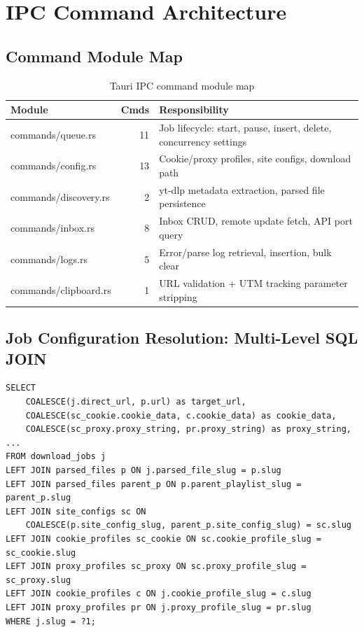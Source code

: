 \documentclass[10pt,letterpaper]{article}
\begin{document}
\section{IPC Command Architecture}

\subsection{Command Module Map}

\begin{table}[H]
\centering\small
\renewcommand{\arraystretch}{1.3}
\begin{tabular}{>{\ttfamily}lrl}
\toprule
Module & Cmds & Responsibility \\
\midrule
commands/queue.rs & 11 & Job lifecycle: start, pause, insert, delete, concurrency settings \\
commands/config.rs & 13 & Cookie/proxy profiles, site configs, download path \\
commands/discovery.rs & 2 & yt-dlp metadata extraction, parsed file persistence \\
commands/inbox.rs & 8 & Inbox CRUD, remote update fetch, API port query \\
commands/logs.rs & 5 & Error/parse log retrieval, insertion, bulk clear \\
commands/clipboard.rs & 1 & URL validation + UTM tracking parameter stripping \\
\bottomrule
\end{tabular}
\caption{Tauri IPC command module map}
\end{table}

\subsection{Job Configuration Resolution: Multi-Level SQL JOIN}

\begin{lstlisting}[caption={Multi-join config resolution (engine/process.rs)}]
SELECT
    COALESCE(j.direct_url, p.url) as target_url,
    COALESCE(sc_cookie.cookie_data, c.cookie_data) as cookie_data,
    COALESCE(sc_proxy.proxy_string, pr.proxy_string) as proxy_string, ...
FROM download_jobs j
LEFT JOIN parsed_files p ON j.parsed_file_slug = p.slug
LEFT JOIN parsed_files parent_p ON p.parent_playlist_slug = parent_p.slug
LEFT JOIN site_configs sc ON
    COALESCE(p.site_config_slug, parent_p.site_config_slug) = sc.slug
LEFT JOIN cookie_profiles sc_cookie ON sc.cookie_profile_slug = sc_cookie.slug
LEFT JOIN proxy_profiles sc_proxy ON sc.proxy_profile_slug = sc_proxy.slug
LEFT JOIN cookie_profiles c ON j.cookie_profile_slug = c.slug
LEFT JOIN proxy_profiles pr ON j.proxy_profile_slug = pr.slug
WHERE j.slug = ?1;
\end{lstlisting}
\end{document}
